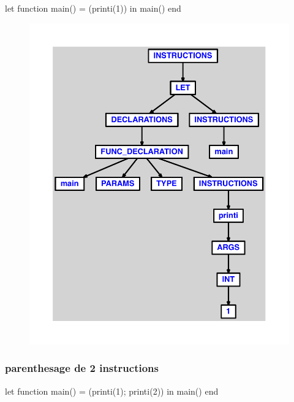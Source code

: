 \documentclass{article}
\begin{document}
\begin{verbatimtab}
let function main() = (printi(1)) in main() end
\end{verbatimtab}
\begin{figure}[H]\centering\includegraphics[max width=\textwidth]{ast/ast_135.pdf}\end{figure}\subsubsection{parenthesage de 2 instructions}
\begin{verbatimtab}
let function main() = (printi(1); printi(2)) in main() end
\end{verbatimtab}
\end{document}
